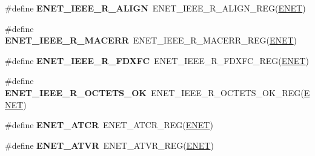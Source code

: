 \begin{DoxyCompactItemize}
\item 
\#define {\bfseries E\+N\+E\+T\+\_\+\+I\+E\+E\+E\+\_\+\+R\+\_\+\+A\+L\+I\+GN}~E\+N\+E\+T\+\_\+\+I\+E\+E\+E\+\_\+\+R\+\_\+\+A\+L\+I\+G\+N\+\_\+\+R\+EG(\hyperlink{group__ENET__Peripheral__Access__Layer_ga4745105f505f3ab949d6a57fbe2a0ed5}{E\+N\+ET})\hypertarget{group__ENET__Register__Accessor__Macros_ga3deebba7193f28275cb1598150dc3c91}{}\label{group__ENET__Register__Accessor__Macros_ga3deebba7193f28275cb1598150dc3c91}

\item 
\#define {\bfseries E\+N\+E\+T\+\_\+\+I\+E\+E\+E\+\_\+\+R\+\_\+\+M\+A\+C\+E\+RR}~E\+N\+E\+T\+\_\+\+I\+E\+E\+E\+\_\+\+R\+\_\+\+M\+A\+C\+E\+R\+R\+\_\+\+R\+EG(\hyperlink{group__ENET__Peripheral__Access__Layer_ga4745105f505f3ab949d6a57fbe2a0ed5}{E\+N\+ET})\hypertarget{group__ENET__Register__Accessor__Macros_ga4d4f33d57b7f466b4ce6d2ebb575fc9f}{}\label{group__ENET__Register__Accessor__Macros_ga4d4f33d57b7f466b4ce6d2ebb575fc9f}

\item 
\#define {\bfseries E\+N\+E\+T\+\_\+\+I\+E\+E\+E\+\_\+\+R\+\_\+\+F\+D\+X\+FC}~E\+N\+E\+T\+\_\+\+I\+E\+E\+E\+\_\+\+R\+\_\+\+F\+D\+X\+F\+C\+\_\+\+R\+EG(\hyperlink{group__ENET__Peripheral__Access__Layer_ga4745105f505f3ab949d6a57fbe2a0ed5}{E\+N\+ET})\hypertarget{group__ENET__Register__Accessor__Macros_gac3b1be1bb00c5beae0960855d0a8920d}{}\label{group__ENET__Register__Accessor__Macros_gac3b1be1bb00c5beae0960855d0a8920d}

\item 
\#define {\bfseries E\+N\+E\+T\+\_\+\+I\+E\+E\+E\+\_\+\+R\+\_\+\+O\+C\+T\+E\+T\+S\+\_\+\+OK}~E\+N\+E\+T\+\_\+\+I\+E\+E\+E\+\_\+\+R\+\_\+\+O\+C\+T\+E\+T\+S\+\_\+\+O\+K\+\_\+\+R\+EG(\hyperlink{group__ENET__Peripheral__Access__Layer_ga4745105f505f3ab949d6a57fbe2a0ed5}{E\+N\+ET})\hypertarget{group__ENET__Register__Accessor__Macros_ga403d0f99ada0b01ac91b2a422b434f2e}{}\label{group__ENET__Register__Accessor__Macros_ga403d0f99ada0b01ac91b2a422b434f2e}

\item 
\#define {\bfseries E\+N\+E\+T\+\_\+\+A\+T\+CR}~E\+N\+E\+T\+\_\+\+A\+T\+C\+R\+\_\+\+R\+EG(\hyperlink{group__ENET__Peripheral__Access__Layer_ga4745105f505f3ab949d6a57fbe2a0ed5}{E\+N\+ET})\hypertarget{group__ENET__Register__Accessor__Macros_gaddc99bc80c74acbf3ea1d0099c0b094b}{}\label{group__ENET__Register__Accessor__Macros_gaddc99bc80c74acbf3ea1d0099c0b094b}

\item 
\#define {\bfseries E\+N\+E\+T\+\_\+\+A\+T\+VR}~E\+N\+E\+T\+\_\+\+A\+T\+V\+R\+\_\+\+R\+EG(\hyperlink{group__ENET__Peripheral__Access__Layer_ga4745105f505f3ab949d6a57fbe2a0ed5}{E\+N\+ET})\hypertarget{group__ENET__Register__Accessor__Macros_gacd0718dcf5c4b96802f4d79530981ca6}{}\label{group__ENET__Register__Accessor__Macros_gacd0718dcf5c4b96802f4d79530981ca6}


\end{DoxyCompactItemize}
